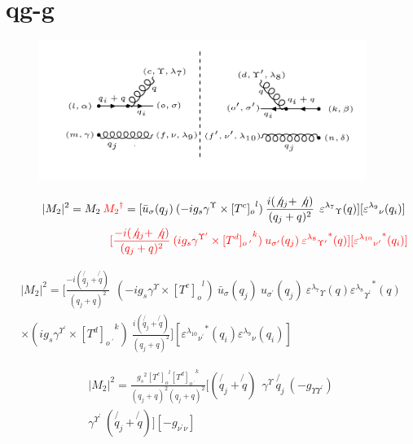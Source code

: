 \section{qg-g}
\begin{figure}[ht!]
\centering
\includegraphics[width=0.95\textwidth]{images/qggM2squer.png}
\end{figure}
\begin{equation}
\begin{split}
|M_2|^2=M_2\:{\color[RGB]{255,0,0} {M_2}^{\dagger}} = [{\bar{u}}_{\sigma}(q_j)\: (-ig_s \gamma^{\Upsilon}\times {[T^c]_o}^l) \: \frac{i(\not{q_j} + \not{q})}{(q_j + q)^2}\:\: {\varepsilon^{\lambda_7}}_{\Upsilon} (q)] [{\varepsilon^{\lambda_9}}_{\nu} (q_i)]\: \\
\quad\quad\quad\quad\quad\quad\quad\quad\:\:{\color[RGB]{255,0,0}[\frac{-i(\not{q_j} + \not{q})}{(q_j + q)^2} \:  (ig_s \gamma^{{\Upsilon}^{\prime}}\times {[T^d]_{o\:^{\prime}}}^k) \: u_{{\sigma}^{\prime}}(q_j) \: {{\varepsilon^{\lambda_8}}_{{\Upsilon}^{\prime}}}^* (q)][{{\varepsilon^{\lambda_{10}}}_{{\nu}^{\prime}}}^* (q_i)]}
\end{split}
\end{equation}

\begin{equation}
\begin{split}
|M_2|^2=[\frac{-i(\not{q_j} + \not{q})}{(q_j + q)^2} \:
 \:  (-ig_s \gamma^{\Upsilon}\times {[T^c]_o}^l) \: {\bar{u}}_{\sigma}(q_j)\:u_{{\sigma}^{\prime}}(q_j) \: {\varepsilon^{\lambda_7}}_{\Upsilon} (q) {{\varepsilon^{\lambda_8}}_{{\Upsilon}^{\prime}}}^* (q) \\
\times (ig_s \gamma^{{\Upsilon}^{\prime}}\times {[T^d]_{o\:^{\prime}}}^k) \: \frac{i(\not{q_j} + \not{q})}{(q_j + q)^2} ]
[{{\varepsilon^{\lambda_{10}}}_{{\nu}^{\prime}}}^* (q_i) {\varepsilon^{\lambda_9}}_{\nu} (q_i)]
\end{split}
\end{equation}

\begin{equation}
\begin{split}
|M_2|^2=\frac{{g_s}^2 {[T^c]_o}^l {[T^d]_{o\:^{\prime}}}^k}{(q_j + q)^2 (q_j + q)^2}
[(\not{q_j} + \not{q}) \:
 \:  \gamma^{\Upsilon} \: \not{q_j} \: (-g_{{\Upsilon}{{\Upsilon}^{\prime}}}) \\
\gamma^{{\Upsilon}^{\prime}} \: (\not{q_j} + \not{q})]
[-g_{{\nu}^{\prime}{\nu}}]
\end{split}
\end{equation}

